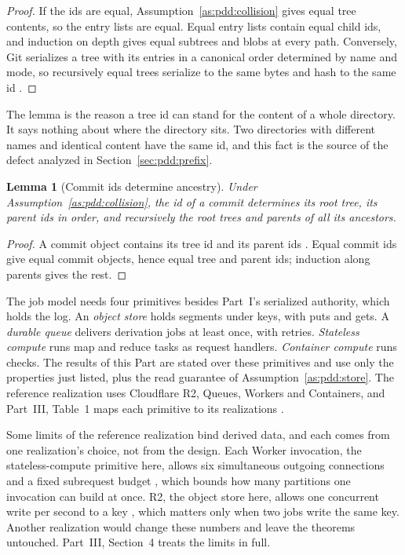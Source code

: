 \documentclass[11pt,letterpaper]{article}
\newtheorem{lemma}[theorem]{Lemma}
\theoremstyle{definition}
\theoremstyle{remark}
\begin{document}
\begin{proof}
If the ids are equal, Assumption~\ref{as:pdd:collision} gives equal tree contents, so the entry lists are equal. Equal entry lists contain equal child ids, and induction on depth gives equal subtrees and blobs at every path. Conversely, Git serializes a tree with its entries in a canonical order determined by name and mode, so recursively equal trees serialize to the same bytes and hash to the same id \cite{gitobjects}.
\end{proof}

The lemma is the reason a tree id can stand for the content of a whole directory. It says nothing about where the directory sits. Two directories with different names and identical content have the same id, and this fact is the source of the defect analyzed in Section~\ref{sec:pdd:prefix}.

\begin{lemma}[Commit ids determine ancestry]
\label{lem:pdd:ancestry}
Under Assumption~\ref{as:pdd:collision}, the id of a commit determines its root tree, its parent ids in order, and recursively the root trees and parents of all its ancestors.
\end{lemma}

\begin{proof}
A commit object contains its tree id and its parent ids \cite{gitobjects}. Equal commit ids give equal commit objects, hence equal tree and parent ids; induction along parents gives the rest.
\end{proof}

The job model needs four primitives besides Part~I's serialized authority, which holds the log. An \emph{object store} holds segments under keys, with puts and gets. A \emph{durable queue} delivers derivation jobs at least once, with retries. \emph{Stateless compute} runs map and reduce tasks as request handlers. \emph{Container compute} runs checks. The results of this Part are stated over these primitives and use only the properties just listed, plus the read guarantee of Assumption~\ref{as:pdd:store}. The reference realization uses Cloudflare R2, Queues, Workers and Containers, and Part~III, Table~1 maps each primitive to its realizations \cite{long2026partIII}.

Some limits of the reference realization bind derived data, and each comes from one realization's choice, not from the design. Each Worker invocation, the stateless-compute primitive here, allows six simultaneous outgoing connections and a fixed subrequest budget \cite{cfworkerslimits}, which bounds how many partitions one invocation can build at once. R2, the object store here, allows one concurrent write per second to a key \cite{cfr2limits}, which matters only when two jobs write the same key. Another realization would change these numbers and leave the theorems untouched. Part~III, Section~4 treats the limits in full.
\end{document}

